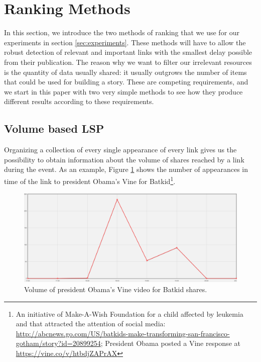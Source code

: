 \documentclass{sig-alternate}
\begin{document}

\section{Ranking Methods}
\label{sec:ranking_methods}
In this section, we introduce the two methods of ranking that we use for our experiments in section \ref{sec:experiments}. These methods will have to allow the robust detection of relevant and important links with the smallest delay possible from their publication. The reason why we want to filter our irrelevant resources is the quantity of data usually shared: it usually outgrows the number of items that could be used for building a story. These are competing requirements, and we start in this paper with two very simple methods to see how they produce different results according to these requirements.

\subsection{Volume based LSP}
\label{sec:volume_based_links_selection}
Organizing a collection of every single appearance of every link gives us the possibility to obtain information about the volume of shares reached by a link during the event. As an example, Figure \ref{fig:batkid_whitehouse_volume} shows the number of appearances in time of the link to president Obama's Vine for Batkid\footnote{An initiative of Make-A-Wish Foundation for a child affected by leukemia and that attracted the attention of social media: \url{http://abcnews.go.com/US/batkids-make-transforming-san-francisco-gotham/story?id=20899254}; President Obama posted a Vine response at \url{https://vine.co/v/htbdjZAPrAX}}.
\begin{figure}[htbp]
  \centering
  \includegraphics[width=\linewidth]{Figures/batkid_whitehouse_volume.png}
  \caption{Volume of president Obama's Vine video for Batkid shares.}
  \label{fig:batkid_whitehouse_volume}
\end{figure}
\end{document}
